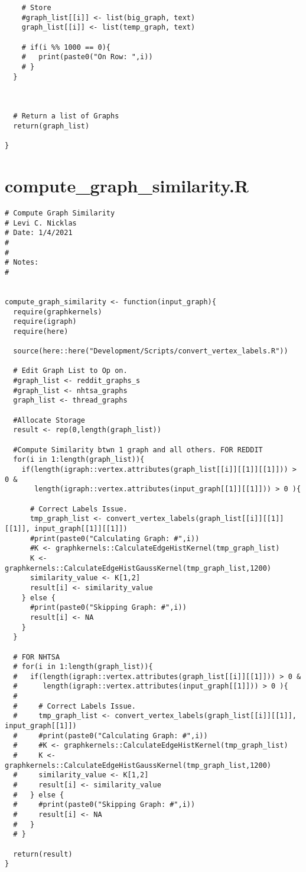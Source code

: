 \begin{appendices}
\begin{lstlisting}
    # Store
    #graph_list[[i]] <- list(big_graph, text)
    graph_list[[i]] <- list(temp_graph, text)
    
    # if(i %% 1000 == 0){
    #   print(paste0("On Row: ",i))
    # }
  }
  
  

  # Return a list of Graphs  
  return(graph_list)
  
}
\end{lstlisting}

\section{compute\_graph\_similarity.R}
\begin{lstlisting}
# Compute Graph Similarity
# Levi C. Nicklas
# Date: 1/4/2021
#
#
# Notes:  
#


compute_graph_similarity <- function(input_graph){
  require(graphkernels)
  require(igraph)
  require(here)
  
  source(here::here("Development/Scripts/convert_vertex_labels.R"))
  
  # Edit Graph List to Op on.
  #graph_list <- reddit_graphs_s
  #graph_list <- nhtsa_graphs
  graph_list <- thread_graphs
  
  #Allocate Storage
  result <- rep(0,length(graph_list))
  
  #Compute Similarity btwn 1 graph and all others. FOR REDDIT
  for(i in 1:length(graph_list)){
    if(length(igraph::vertex.attributes(graph_list[[i]][[1]][[1]])) > 0 &
       length(igraph::vertex.attributes(input_graph[[1]][[1]])) > 0 ){

      # Correct Labels Issue.
      tmp_graph_list <- convert_vertex_labels(graph_list[[i]][[1]][[1]], input_graph[[1]][[1]])
      #print(paste0("Calculating Graph: #",i))
      #K <- graphkernels::CalculateEdgeHistKernel(tmp_graph_list)
      K <- graphkernels::CalculateEdgeHistGaussKernel(tmp_graph_list,1200)
      similarity_value <- K[1,2]
      result[i] <- similarity_value
    } else {
      #print(paste0("Skipping Graph: #",i))
      result[i] <- NA
    }
  }
  
  # FOR NHTSA
  # for(i in 1:length(graph_list)){
  #   if(length(igraph::vertex.attributes(graph_list[[i]][[1]])) > 0 & 
  #      length(igraph::vertex.attributes(input_graph[[1]])) > 0 ){
  #     
  #     # Correct Labels Issue.
  #     tmp_graph_list <- convert_vertex_labels(graph_list[[i]][[1]], input_graph[[1]])
  #     #print(paste0("Calculating Graph: #",i))
  #     #K <- graphkernels::CalculateEdgeHistKernel(tmp_graph_list)
  #     K <- graphkernels::CalculateEdgeHistGaussKernel(tmp_graph_list,1200)
  #     similarity_value <- K[1,2]
  #     result[i] <- similarity_value
  #   } else {
  #     #print(paste0("Skipping Graph: #",i))
  #     result[i] <- NA
  #   }
  # }
  
  return(result)
}
\end{lstlisting}


\end{appendices}

